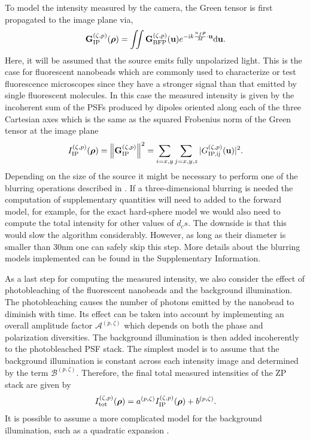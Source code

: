 \documentclass[reprint,aps,pra,superscriptaddress,
amsmath,amssymb]{revtex4-1}
\begin{document}
To model the intensity measured by the camera, the Green tensor is first 
propagated to the image plane via,
\begin{align}
\textbf G^{(\zeta ,p)}_\text{IP} (\boldsymbol \rho ) 
= \iint \textbf G^{(\zeta ,p)}_\text{BFP} (\textbf u)  
e^{ - \text{i} k  \frac{n_f \boldsymbol \rho}{M}  \cdot \textbf u } \mathrm{d} \textbf u .
\end{align}
Here, it will be assumed that the source emits fully unpolarized light. This 
is the case for fluorescent nanobeads which are commonly used to characterize or test 
fluorescence microscopes since they have a stronger signal than that emitted 
by single fluorescent molecules. In this case the measured intensity is 
given by the incoherent sum of the PSFs produced by dipoles oriented along 
each of the three Cartesian axes which is the same as the squared Frobenius 
norm of the Green tensor at the image plane 
\begin{align}
I^{(\zeta ,p)}_\text{IP} (\boldsymbol \rho ) = \left\lVert\textbf G^{(\zeta ,p)}_\text{IP} \right\rVert^2 
= \sum_{i=x,y} \sum_{j=x,y,z} |G^{(\zeta ,p)}_\text{IP,ij}( \textbf u)|^2.
\end{align}
Depending on the size of the source it might be necessary to perform 
one of the blurring operations described in \cite{}. If a three-dimensional 
blurring is needed the computation of supplementary quantities will need to 
added to the forward model, for example, for the exact hard-sphere model 
we would also need to compute the total intensity for other values of $d_cs$.
The downside is that this would slow the algorithm considerably. 
However, as long as their 
diameter is smaller than 30nm one can safely skip this step.
More details about the blurring models implemented can be found in the 
Supplementary Information.

As a last step for computing the measured intensity, we also consider 
the effect of photobleaching of the fluorescent nanobeads and the background 
illumination. The photobleaching causes the number of photons emitted by the 
nanobead to diminish with time. Its effect can be taken into account by 
implementing an overall amplitude factor $\mathcal{A}^{(p,\zeta)}$
which depends on both the phase and polarization diversities. The background 
illumination is then added incoherently to the photobleached PSF stack. 
The simplest model is to assume that the background illumination is constant 
across each intensity image and determined by the term 
$\mathcal{B}^{(p,\zeta)}$. Therefore, the final total measured intensities 
of the ZP stack are given by 
\begin{align}
I^{(\zeta ,p)}_\text{tot} (\boldsymbol \rho )  
  =  a^{(p,\zeta)} I^{(\zeta ,p)}_\text{IP} (\boldsymbol \rho ) + b^{(p,\zeta)}.
\end{align}
It is possible to assume a more complicated model for the background 
illumination, such as a quadratic expansion \cite{aristov2018zola}. 
\end{document}
